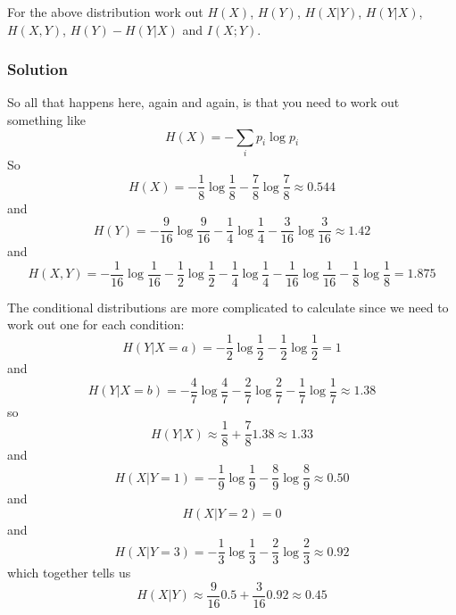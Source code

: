 \documentclass[12pt]{article}
\begin{document}
For the above distribution work out $H(X)$, $H(Y)$, $H(X|Y)$,
$H(Y|X)$, $H(X,Y)$, $H(Y)-H(Y|X)$ and $I(X;Y)$.

\subsubsection*{Solution}

So all that happens here, again and again, is that you need to work out something like
\begin{equation}
  H(X)=-\sum_i p_i\log{p_i}
\end{equation}
So
\begin{equation}
  H(X)=-\frac{1}{8}\log{\frac{1}{8}}-\frac{7}{8}\log{\frac{7}{8}}\approx 0.544
\end{equation}
and
\begin{equation}
H(Y)=-\frac{9}{16}\log{\frac{9}{16}}-\frac{1}{4}\log{\frac{1}{4}}-\frac{3}{16}\log{\frac{3}{16}}\approx 1.42
\end{equation}
and
\begin{equation}
  H(X,Y)=-\frac{1}{16}\log{\frac{1}{16}}-\frac{1}{2}\log{\frac{1}{2}}-\frac{1}{4}\log{\frac{1}{4}}-\frac{1}{16}\log{\frac{1}{16}}-\frac{1}{8}\log{\frac{1}{8}} = 1.875
\end{equation}

The conditional distributions are more complicated to calculate since we need to work out one for each condition:
\begin{equation}
  H(Y|X=a)=-\frac{1}{2}\log{\frac{1}{2}}-\frac{1}{2}\log{\frac{1}{2}}=1
\end{equation}
and
\begin{equation}
  H(Y|X=b)=-\frac{4}{7}\log{\frac{4}{7}}-\frac{2}{7}\log{\frac{2}{7}}-\frac{1}{7}\log{\frac{1}{7}}\approx 1.38
\end{equation}
so
\begin{equation}
  H(Y|X)\approx\frac{1}{8}+\frac{7}{8}1.38\approx 1.33
\end{equation}
and
\begin{equation}
  H(X|Y=1)=-\frac{1}{9}\log{\frac{1}{9}}-\frac{8}{9}\log{\frac{8}{9}}\approx 0.50
\end{equation}
and
\begin{equation}
  H(X|Y=2)=0
\end{equation}
and
\begin{equation}
  H(X|Y=3)=-\frac{1}{3}\log{\frac{1}{3}}-\frac{2}{3}\log{\frac{2}{3}}\approx 0.92
\end{equation}
which together tells us
\begin{equation}
  H(X|Y)\approx\frac{9}{16}0.5+\frac{3}{16}0.92\approx 0.45
\end{equation}
\end{document}

